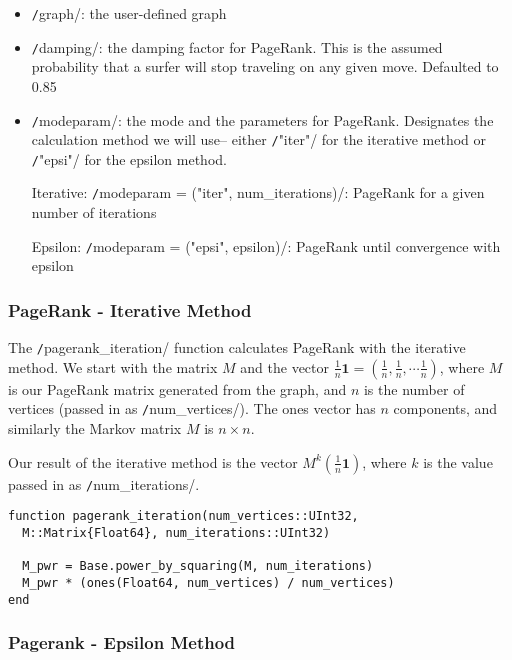\documentclass[12pt, titlepage, twoside]{amsart}
\renewcommand{\vec}[1]{\ensuremath{\mathbf{#1}}}
\theoremstyle{remark}
\begin{document}
\begin{itemize}[label={}]
\item \texttt/graph/: the user-defined graph

\item \texttt/damping/: the damping factor for PageRank. 
This is the assumed probability that a surfer will stop traveling on any given move. Defaulted to 0.85

\item \texttt/modeparam/: the mode and the parameters for PageRank.
Designates the calculation method we will use-- 
either \texttt/"iter"/ for the iterative method or \texttt/"epsi"/ for the epsilon method.

Iterative: \texttt/modeparam = ("iter", num_iterations)/:
PageRank for a given number of iterations

Epsilon: \texttt/modeparam = ("epsi", epsilon)/: PageRank until convergence with epsilon
\end{itemize}

\subsubsection{PageRank - Iterative Method}

The \texttt/pagerank_iteration/ function calculates PageRank with the iterative method. 
We start with the matrix $M$ and the vector $\frac{1}{n}\vec{1} = (\frac{1}{n}, \frac{1}{n}, \cdots \frac{1}{n})$, 
where $M$ is our PageRank matrix generated from the graph, 
and $n$ is the number of vertices (passed in as \texttt/num_vertices/).
The ones vector has $n$ components, and similarly the Markov matrix $M$ is $n\times n$.

Our result of the iterative method is the vector $M^k (\frac{1}{n}\vec{1})$, 
where $k$ is the value passed in as \texttt/num_iterations/.

\begin{verbatim}
function pagerank_iteration(num_vertices::UInt32,
  M::Matrix{Float64}, num_iterations::UInt32)
  
  M_pwr = Base.power_by_squaring(M, num_iterations)
  M_pwr * (ones(Float64, num_vertices) / num_vertices)
end
\end{verbatim}


 \subsubsection{Pagerank - Epsilon Method}
\end{document}
